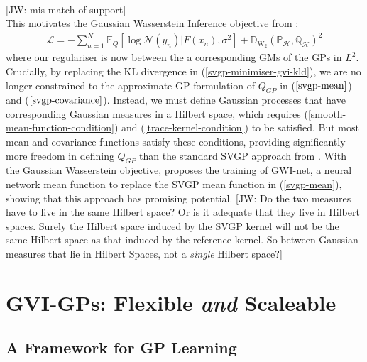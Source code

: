 \documentclass{article}
\newcommand{\jw}[1]{{\color{gray} [JW: #1]}}
\newcommand{\KLD}{\operatorname{\mathbb{D}_{KL}}}
\newcommand{\WD}{\operatorname{\mathbb{D}_{W_2}}}
\numberwithin{equation}{section}
\begin{document}
\\\jw{mis-match of support}
\\This motivates the Gaussian Wasserstein Inference objective from \cite{wild2022generalized}:
\begin{align}
    \label{gwi-objective}
    \mathcal{L} = -\sum_{n=1}^N \mathbb{E}_{Q}\left[\log \mathcal{N}(y_n) \vert F(x_n), \sigma^2\right] + \WD \left(\mathbb{P}_{\mathcal{H}}, \mathbb{Q}_{\mathcal{H}}\right)^2
\end{align}
where our regulariser is now between the a corresponding GMs of the GPs in $L^2$.
Crucially, by replacing the KL divergence in (\ref{svgp-minimiser-gvi-kld}), we are no longer constrained to the approximate GP formulation of $Q_{GP}$ in  ($\ref{svgp-mean}$) and ($\ref{svgp-covariance}$). Instead, we must define Gaussian processes that have corresponding Gaussian measures in a Hilbert space, which requires (\ref{smooth-mean-function-condition}) and (\ref{trace-kernel-condition}) to be satisfied. But most mean and covariance functions satisfy these conditions, providing significantly more freedom in defining $Q_{GP}$ than the standard SVGP approach from \cite{titsias2009variational}. With the Gaussian Wasserstein objective, \cite{wild2022generalized} proposes the training of GWI-net, a neural network mean function to replace the SVGP mean function in (\ref{svgp-mean}), showing that this approach has promising potential.
\jw{Do the two measures have to live in the same Hilbert space? Or is it adequate that they live in Hilbert spaces. Surely the Hilbert space induced by the SVGP kernel will not be the same Hilbert space as that induced by the reference kernel. So between Gaussian measures that lie in Hilbert Spaces, not a \textit{single} Hilbert space?}


\newpage
\section{GVI-GPs: Flexible \textit{and} Scaleable}
\subsection{A Framework for GP Learning}
\end{document}
